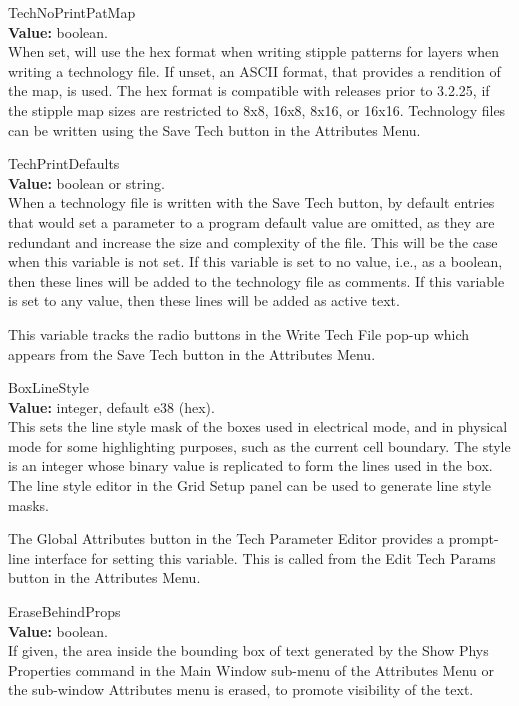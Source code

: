 \begin{description}
\item{\et TechNoPrintPatMap}\\
{\bf Value:} boolean.\\
When set, {\Xic} will use the hex format when writing stipple patterns
for layers when writing a technology file.  If unset, an ASCII format,
that provides a rendition of the map, is used.  The hex format is
compatible with {\Xic} releases prior to 3.2.25, if the stipple map
sizes are restricted to 8x8, 16x8, 8x16, or 16x16.  Technology files
can be written using the {\cb Save Tech} button in the {\cb Attributes
Menu}.

\item{\et TechPrintDefaults}\\
{\bf Value:} boolean or string.\\
When a technology file is written with the {\cb Save Tech} button, by
default entries that would set a parameter to a program default value
are omitted, as they are redundant and increase the size and
complexity of the file.  This will be the case when this variable is
not set.  If this variable is set to no value, i.e., as a boolean,
then these lines will be added to the technology file as comments.  If
this variable is set to any value, then these lines will be added as
active text.

This variable tracks the radio buttons in the {\cb Write Tech File}
pop-up which appears from the {\cb Save Tech} button in the {\cb
Attributes Menu}.

\item{\et BoxLineStyle}\\
{\bf Value:} integer, default e38 (hex).\\
This sets the line style mask of the boxes used in electrical mode,
and in physical mode for some highlighting purposes, such as the
current cell boundary.  The style is an integer whose binary value is
replicated to form the lines used in the box.  The line style editor
in the {\cb Grid Setup} panel can be used to generate line style
masks.

The {\cb Global Attributes} button in the {\cb Tech Parameter Editor}
provides a prompt-line interface for setting this variable.  This is
called from the {\cb Edit Tech Params} button in the {\cb Attributes
Menu}.

\item{\et EraseBehindProps}\\
{\bf Value:} boolean.\\
If given, the area inside the bounding box of text generated by the
{\cb Show Phys Properties} command in the {\cb Main Window} sub-menu
of the {\cb Attributes Menu} or the sub-window {\cb Attributes} menu
is erased, to promote visibility of the text.


\end{description}
